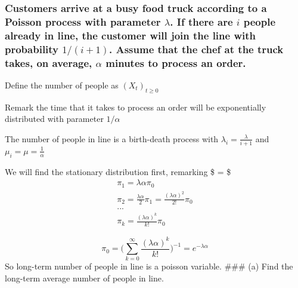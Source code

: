 \documentclass[]{article}
\begin{document}
\hypertarget{customers-arrive-at-a-busy-food-truck-according-to-a-poisson-process-with-parameter-lambda.-if-there-are-i-people-already-in-line-the-customer-will-join-the-line-with-probability-1i-1.-assume-that-the-chef-at-the-truck-takes-on-average-alpha-minutes-to-process-an-order.}{%
\subsubsection{\texorpdfstring{Customers arrive at a busy food truck
according to a Poisson process with parameter \(\lambda\). If there are
\(i\) people already in line, the customer will join the line with
probability \(1/(i + 1)\). Assume that the chef at the truck takes, on
average, \(\alpha\) minutes to process an
order.}{Customers arrive at a busy food truck according to a Poisson process with parameter \textbackslash{}lambda. If there are i people already in line, the customer will join the line with probability 1/(i + 1). Assume that the chef at the truck takes, on average, \textbackslash{}alpha minutes to process an order.}}\label{customers-arrive-at-a-busy-food-truck-according-to-a-poisson-process-with-parameter-lambda.-if-there-are-i-people-already-in-line-the-customer-will-join-the-line-with-probability-1i-1.-assume-that-the-chef-at-the-truck-takes-on-average-alpha-minutes-to-process-an-order.}}

Define the number of people as \((X_t)_{t \geq 0}\)

Remark the time that it takes to process an order will be exponentially
distributed with parameter \(1/ \alpha\)

The number of people in line is a birth-death process with
\(\lambda_i = \frac{\lambda}{i+1}\) and
\(\mu_i = \mu = \frac{1}{\alpha}\)

We will find the stationary distribution first, remarking
\$ =  \$ \[
\begin{array}{c}
\pi_1 = \lambda\alpha \pi_0 \\
\pi_2 = \frac{\lambda\alpha}{2} \pi_1 = \frac{(\lambda\alpha)^2}{2!} \pi_0 \\
... \\
\pi_k = \frac{(\lambda\alpha)^k}{k!} \pi_0
\end{array}
\]

\[
\pi_0 = \bigg( \sum_{k=0}^\infty \frac{(\lambda\alpha)^k}{k!} \bigg)^{-1} = e^{-\lambda \alpha}
\] So long-term number of people in line is a poisson variable. \#\#\#
(a) Find the long-term average number of people in line.
\end{document}

